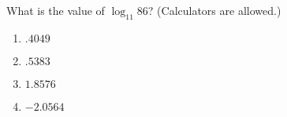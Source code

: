 \bigskip

\item What is the value of $\log_{11} 86$?  (Calculators are allowed.)

    \begin{enumerate}
    \item $.4049$
    \item $.5383$
    \item $1.8576$
    \item $-2.0564$
    \end{enumerate}

